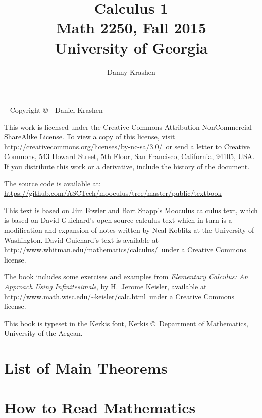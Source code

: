 \documentclass[justified,openany,nofonts]{tufte-book}
\title{Calculus 1\\ Math 2250, Fall 2015\\
University of Georgia}
\author{Danny Krashen}
\begin{document}
\maketitle



\begin{fullwidth}
~\vfill
\thispagestyle{empty}
\setlength{\parindent}{0pt}
\setlength{\parskip}{\baselineskip}
Copyright \copyright\ \the\year\ Daniel Krashen 

This work is licensed under the Creative Commons
Attribution-NonCommercial-ShareAlike License. To view a copy of this
license, visit
\url{http://creativecommons.org/licenses/by-nc-sa/3.0/}~or send a
letter to Creative Commons, 543 Howard Street, 5th Floor, San
Francisco, California, 94105, USA. If you distribute this work or a
derivative, include the history of the document. 

The source code is available
at: \url{https://github.com/ASCTech/mooculus/tree/master/public/textbook}

\noindent
This text is based on Jim Fowler and Bart Snapp's Mooculus calculus text,
which is based on David Guichard's open-source calculus text which
in turn is a modification and expansion of notes written by Neal
Koblitz at the University of Washington. David Guichard's text is
available at \url{http://www.whitman.edu/mathematics/calculus/}~under a Creative Commons license.

\noindent The book includes some exercises and examples from {\it
  Elementary Calculus: An Approach Using Infinitesimals}, by H.~Jerome
Keisler, available at
\url{http://www.math.wisc.edu/~keisler/calc.html}~under a Creative
Commons license. 


\noindent This book is typeset in the Kerkis font, 
Kerkis \copyright~Department of Mathematics, University of the Aegean.

\end{fullwidth}


\tableofcontents



\chapter*{List of Main Theorems}%

\chapter*{How to Read Mathematics}
\end{document}
